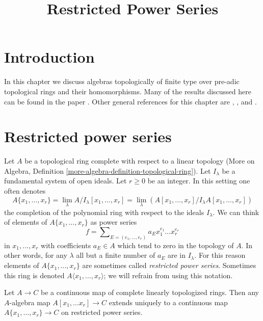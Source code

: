

%


\title{Restricted Power Series}


\maketitle

\label{section-phantom}

\tableofcontents

\section{Introduction}
\label{section-introduction}

\noindent
In this chapter we discuss algebras topologically of finite type
over pre-adic topological rings and their homomorphisms. Many of
the results discussed here can be found in the paper \cite{Elkik}.
Other general references for this chapter are \cite{EGA}, \cite{Abbes},
and \cite{Fujiwara-Kato}.




\section{Restricted power series}
\label{section-restricted-power-series}

\noindent
Let $A$ be a topological ring complete with respect to a linear
topology (More on Algebra, Definition
\ref{more-algebra-definition-topological-ring}).
Let $I_\lambda$ be a fundamental system of open ideals.
Let $r \geq 0$ be an integer. In this setting one often
denotes
$$
A\{x_1, \ldots, x_r\} =
\lim_\lambda A/I_\lambda[x_1, \ldots, x_r] =
\lim_\lambda (A[x_1, \ldots, x_r]/I_\lambda A[x_1, \ldots, x_r])
$$
the completion of the polynomial ring with respect to the
ideals $I_\lambda$. We can think of elements of $A\{x_1, \ldots, x_r\}$ as
power series
$$
f = \sum\nolimits_{E = (e_1, \ldots, e_r)} a_E x_1^{e_1} \ldots x_r^{e_r}
$$
in $x_1, \ldots, x_r$ with coefficients $a_E \in A$ which tend
to zero in the topology of $A$. In other words, for any $\lambda$
all but a finite number of $a_E$ are in $I_\lambda$.
For this reason elements of $A\{x_1, \ldots, x_r\}$ are sometimes
called {\it restricted power series}.
Sometimes this ring is denoted $A\langle x_1, \ldots, x_r\rangle$;
we will refrain from using this notation.

\begin{remark}
\label{remark-universal-property}
\begin{reference}
\cite[Chapter 0, 7.5.3]{EGA}
\end{reference}
Let $A \to C$ be a continuous map of complete linearly topologized rings.
Then any $A$-algebra map $A[x_1, \ldots x_r] \to C$ extends uniquely to a
continuous map $A\{x_1, \ldots, x_r\} \to C$ on restricted power series.
\end{remark}

